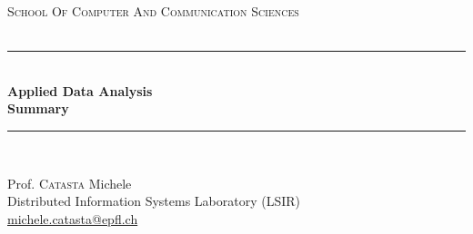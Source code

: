 \documentclass[a4paper,11pt,twoside]{article}
\newcommand{\mail}[1]{{\href{mailto:#1}{#1}}}
\begin{document}
\begin{titlepage} %
\begin{center}
\newcommand{\HRule}{\rule{\linewidth}{0.5mm}} %
\center %
 



\begin{figure} [h] %
\centerline{
} 
\end{figure}


\vspace{0.5cm}
\textsc{\Large School Of Computer And Communication Sciences}\\[0.5cm] %
\textsc{\Large }\\%

\HRule \\[0.4cm]
{ \huge \bfseries Applied Data Analysis \\Summary}\\[0.4cm] %
\HRule \\[1.5cm]

\begin{flushleft} \large
Prof. \textsc{Catasta} Michele\\
Distributed Information Systems Laboratory (LSIR) \\
\mail{michele.catasta@epfl.ch} \\ 
\end{flushleft}


\end{center}
\end{titlepage}
\end{document}
